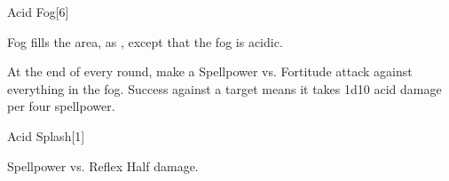 \begin{spellsection}{Acid Fog}[6]
    \begin{spellheader}
    \end{spellheader}
    \begin{spellcontent}
        \begin{spelltargetinginfo}
        \end{spelltargetinginfo}
        \begin{spelleffects}
            \spelleffect Fog fills the area, as , except that the fog is acidic.

            At the end of every round, make a Spellpower vs. Fortitude attack against everything in the fog. Success against a target means it takes 1d10 acid damage per four spellpower.
            \spelldur \durshort
        \end{spelleffects}
    \end{spellcontent}
    \begin{spellfooter}
        \spellnotes \physicalspellnotes
        \miscastyou
    \end{spellfooter}
\end{spellsection}

\begin{spellsection}{Acid Splash}[1]
    \begin{spellheader}
    \end{spellheader}
    \begin{spellcontent}
        \begin{spelltargetinginfo}
        \end{spelltargetinginfo}
        \begin{spelleffects}
            \begin{spellattack}{Spellpower vs. Reflex}
                \spellsuccess {}
                \spellfailure Half damage.
            \end{spellattack}
        \end{spelleffects}
    \end{spellcontent}
    \begin{spellfooter}
        \spellnotes \physicalspellnotes
        \miscastrandom
    \end{spellfooter}
\end{spellsection}

